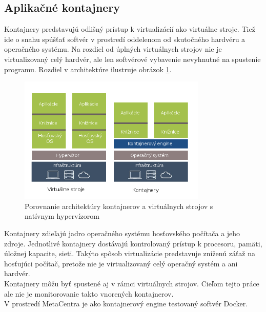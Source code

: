 \documentclass[printed,11pt,twoside,color,cover,table]{fithesis3}
\begin{document}
\subsection{Aplikačné kontajnery}
Kontajnery predstavujú odlišný prístup k virtualizácií ako virtuálne stroje. Tiež ide o snahu spúšťať softvér v prostredí oddelenom od skutočného hardvéru a operačného systému. Na rozdiel od úplných 
virtuálnych strojov nie je virtualizovaný celý hardvér, ale len softvérové vybavenie nevyhnutné na spustenie programu. Rozdiel v architektúre ilustruje obrázok \ref{fig:containers}. 
\begin{figure}
\begin{center}
       \includegraphics[width=0.8\textwidth]{images/kontajnery-virtualky.png}
       \caption{Porovnanie architektúry kontajnerov a virtuálnych strojov s natívnym hypervízorom}
       \label{fig:containers}
\end{center}
\end{figure}
Kontajnery zdieľajú jadro operačného systému hosťovského počítača a jeho zdroje. Jednotlivé kontajnery dostávajú kontrolovaný prístup k procesoru, pamäti, úložnej kapacite, 
sieti. Takýto spôsob virtualizácie predstavuje zníženú záťaž na hosťujúci počítač, pretože nie je virtualizovaný celý operačný systém a ani hardvér.
\\Kontajnery môžu byť spustené aj v rámci virtuálnych strojov. Cieľom tejto práce ale nie je monitorovanie takto vnorených kontajnerov.
\\V prostredí MetaCentra je ako kontajnerový engine testovaný softvér Docker\cite{Docker}.
 
\end{document}
